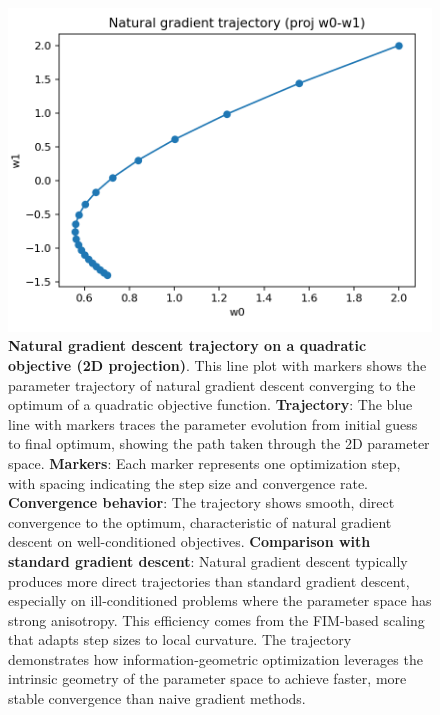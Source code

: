 \documentclass[
  10pt,
]{article}
\begin{document}
\begin{figure}
\centering
\includegraphics{../output/figures/natural_gradient_path.png}
\caption{\textbf{Natural gradient descent trajectory on a quadratic
objective (2D projection)}. This line plot with markers shows the
parameter trajectory of natural gradient descent converging to the
optimum of a quadratic objective function. \textbf{Trajectory}: The blue
line with markers traces the parameter evolution from initial guess to
final optimum, showing the path taken through the 2D parameter space.
\textbf{Markers}: Each marker represents one optimization step, with
spacing indicating the step size and convergence rate.
\textbf{Convergence behavior}: The trajectory shows smooth, direct
convergence to the optimum, characteristic of natural gradient descent
on well-conditioned objectives. \textbf{Comparison with standard
gradient descent}: Natural gradient descent typically produces more
direct trajectories than standard gradient descent, especially on
ill-conditioned problems where the parameter space has strong
anisotropy. This efficiency comes from the FIM-based scaling that adapts
step sizes to local curvature. The trajectory demonstrates how
information-geometric optimization leverages the intrinsic geometry of
the parameter space to achieve faster, more stable convergence than
naive gradient methods.}
\end{figure}
\end{document}
